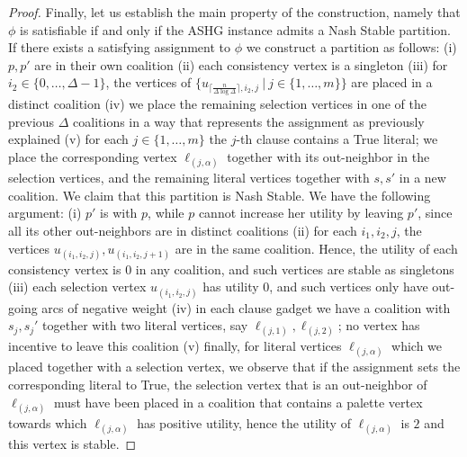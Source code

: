 \documentclass[letterpaper,USenglish,cleveref, autoref, thm-restate]{lipics-v2021}
\begin{document}
\begin{proof}
Finally, let us establish the main property of the construction, namely that
$\phi$ is satisfiable if and only if the ASHG instance admits a Nash Stable
partition. If there exists a satisfying assignment to $\phi$ we construct a
partition as follows: (i) $p,p'$ are in their own coalition (ii) each
consistency vertex is a singleton (iii) for $i_2\in \{0,\ldots,\Delta-1\}$, the
vertices of $\{ u_{\lceil\frac{n}{\Delta\log\Delta}\rceil,i_2,j}\ |\
j\in\{1,\ldots,m\}\}$ are placed in a distinct coalition (iv) we place the
remaining selection vertices in one of the previous $\Delta$ coalitions in a
way that represents the assignment as previously explained (v) for each
$j\in\{1,\ldots,m\}$ the $j$-th clause contains a True literal; we place the
corresponding vertex $\ell_{(j,\alpha)}$ together with its out-neighbor in the
selection vertices, and the remaining literal vertices together with $s,s'$ in
a new coalition. We claim that this partition is Nash Stable. We have the
following argument: (i) $p'$ is with $p$, while $p$ cannot increase her utility
by leaving $p'$, since all its other out-neighbors are in distinct coalitions
(ii) for each $i_1,i_2,j$, the vertices $u_{(i_1,i_2,j)}, u_{(i_1,i_2,j+1)}$
are in the same coalition. Hence, the utility of each consistency vertex is $0$
in any coalition, and such vertices are stable as singletons (iii) each
selection vertex $u_{(i_1,i_2,j)}$ has utility $0$, and such vertices only have
out-going arcs of negative weight (iv) in each clause gadget we have a
coalition with $s_j, s_j'$ together with two literal vertices, say
$\ell_{(j,1)}, \ell_{(j,2)}$; no vertex has incentive to leave this coalition
(v) finally, for literal vertices $\ell_{(j,\alpha)}$ which we placed together
with a selection vertex, we observe that if the assignment sets the
corresponding literal to True, the selection vertex that is an out-neighbor of
$\ell_{(j,\alpha)}$ must have been placed in a coalition that contains a
palette vertex towards which $\ell_{(j,\alpha)}$ has positive utility, hence
the utility of $\ell_{(j,\alpha)}$ is $2$ and this vertex is stable.


\end{proof}
\end{document}
